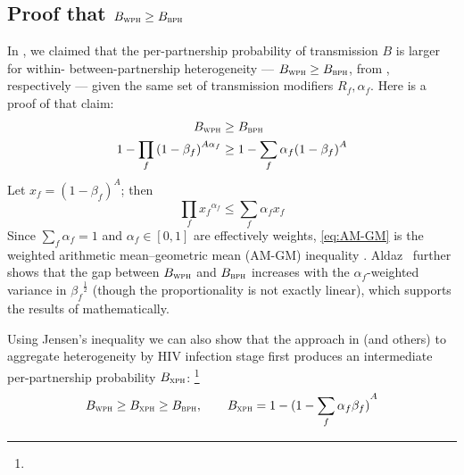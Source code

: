 \subsection{Proof that $B_{\textsc{wph}} \ge B_{\textsc{bph}}$}\label{sr.foi.proof}
In , we claimed that
the per-partnership probability of transmission $B$ is larger for
within- \vs between-partnership heterogeneity
--- $B_{\textsc{wph}} \ge B_{\textsc{bph}}$, from , respectively ---
given the same set of transmission modifiers $R_f, \alpha_f$.
Here is a proof of that claim:
\begin{equation}
  \begin{aligned}
    B_{\textsc{wph}} &\ge B_{\textsc{bph}} \\
    1 - \prod_f {(1 - \beta_f)}^{A\alpha_f} &\ge 1 - \sum_f \alpha_f {(1 - \beta_f)}^{A}
  \end{aligned}
\end{equation}
Let $x_f = {(1 - \beta_f)}^A$; then
\begin{equation}\label{eq:AM-GM}
  \prod_f {x_f}^{\alpha_f} \le \sum_f \alpha_f x_f
\end{equation}
Since $\sum_f \alpha_f = 1$ and $\alpha_f \in [0,1]$ are effectively weights,
\eqref{eq:AM-GM} is the weighted arithmetic mean--geometric mean (AM-GM) inequality \cite{Aldaz2009}.
Aldaz~\cite{Aldaz2009} further shows that the gap between $B_{\textsc{wph}}$ and $B_{\textsc{bph}}$
increases with the $\alpha_f$-weighted variance in ${\beta_f}^{\frac12}$
(though the proportionality is not exactly linear),
which supports the results of  mathematically.
\par
Using Jensen's inequality \cite{Jensen1906} we can also show that
the approach in \cite{Kerr2015} (and others)
to aggregate heterogeneity by HIV infection stage first
produces an intermediate per-partnership probability $B_{\textsc{xph}}$:%
\footnote{}
\begin{equation}
  B_{\textsc{wph}} \ge B_{\textsc{xph}} \ge B_{\textsc{bph}},
  \qquad B_{\textsc{xph}} = 1 - {(1 - \sum_f \alpha_f \beta_f)}^{A}
\end{equation}
